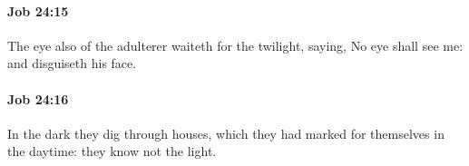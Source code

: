 		\paragraph{Job 24:15} %
			\label{JOB-24-15}

			The eye also of the adulterer waiteth for the twilight, saying, No eye shall see me: and disguiseth his face.


		\paragraph{Job 24:16} %
			\label{JOB-24-16}

			In the dark they dig through houses, which they had marked for themselves in the daytime: they know not the light.


